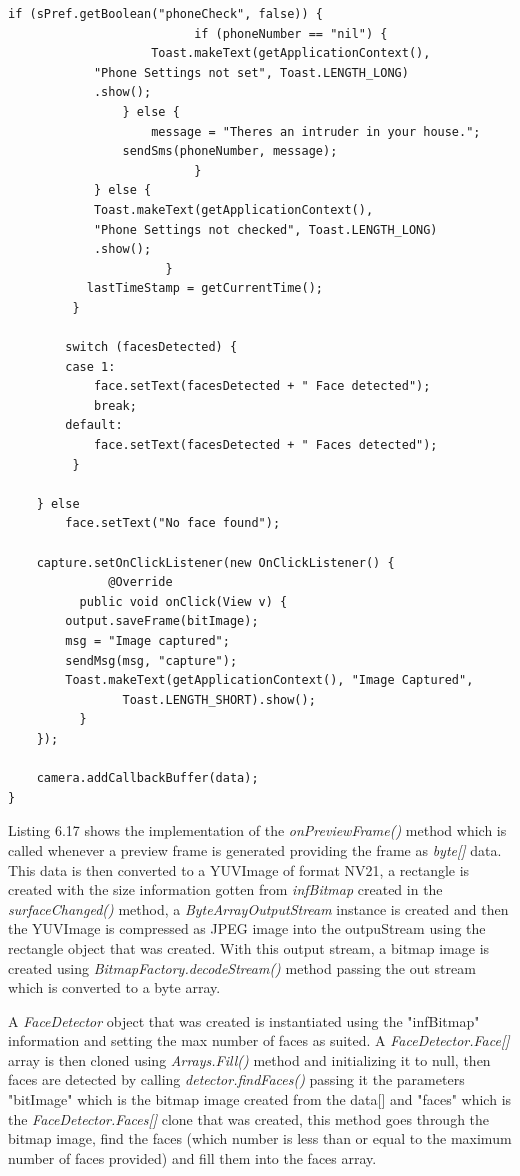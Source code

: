 \begin{lstlisting}[label=onPreview-frame,caption=Method for generating preview frames]
		   if (sPref.getBoolean("phoneCheck", false)) {
                          if (phoneNumber == "nil") {
		         	Toast.makeText(getApplicationContext(),
			"Phone Settings not set", Toast.LENGTH_LONG)
			.show();
		        } else {
		          	message = "Theres an intruder in your house.";
				sendSms(phoneNumber, message);
                          }
		    } else {
			Toast.makeText(getApplicationContext(),
			"Phone Settings not checked", Toast.LENGTH_LONG)
			.show();
                      }
		   lastTimeStamp = getCurrentTime();
	     }
			
	    switch (facesDetected) {
		case 1:
			face.setText(facesDetected + " Face detected");
			break;
		default:
			face.setText(facesDetected + " Faces detected");
	     }

	} else
		face.setText("No face found");

	capture.setOnClickListener(new OnClickListener() {
              @Override
	      public void onClick(View v) {
		output.saveFrame(bitImage);
		msg = "Image captured";
		sendMsg(msg, "capture");
		Toast.makeText(getApplicationContext(), "Image Captured",
				Toast.LENGTH_SHORT).show();
	      }
	});

	camera.addCallbackBuffer(data);
}
\end{lstlisting}

Listing 6.17 shows the implementation of the {\it onPreviewFrame()} method which is called whenever a preview frame is generated providing the frame as  {\it byte[]} data. This data is then converted to a YUVImage of format NV21, a rectangle is created with the size information gotten from {\it infBitmap} created in the {\it surfaceChanged()} method, a {\it ByteArrayOutputStream} instance is created and then the YUVImage is compressed as JPEG image into the outpuStream using the rectangle object that was created. With this output stream, a bitmap image is created using {\it BitmapFactory.decodeStream()} method passing the out stream which is converted to a byte array.

A {\it FaceDetector} object that was created is instantiated using the "infBitmap" information and setting the max number of faces as suited. A {\it FaceDetector.Face[]} array is then cloned using {\it Arrays.Fill()} method and initializing it to null, then faces are detected by calling {\it detector.findFaces()} passing it the parameters "bitImage" which is the bitmap image created from the data[] and "faces" which is the {\it FaceDetector.Faces[]} clone that was created, this method goes through the bitmap image, find the faces (which number is less than or equal to the maximum number of faces provided) and fill them into the faces array. 

